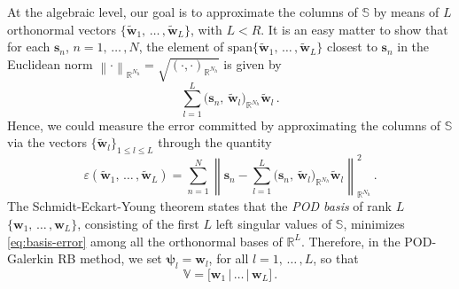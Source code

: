 \documentclass{elsarticle}
\numberwithin{equation}{section}
\theoremstyle{theorem}
\theoremstyle{definition}
\theoremstyle{remark}
\theoremstyle{proposition}
\numberwithin{figure}{section}
\newcommand{\norm}[1]{\left\lVert#1\right\rVert}
\newcommand{\wt}[1]{\widetilde{#1}}
\newcommand{\bg}[1]{\boldsymbol{#1}}
\begin{document}
		\noindent At the algebraic level, our goal is to approximate the columns of $\mathbb{S}$ by means of $L$ orthonormal vectors $\big\lbrace \wt{\mathbf{w}}_1, \, \ldots \, , \wt{\mathbf{w}}_L \big\rbrace$, with $L < R$. It is an easy matter to show that for each $\mathbf{s}_n$, $n = 1, \, \ldots \, , N$, the element of $\text{span} \big\lbrace \wt{\mathbf{w}}_1, \, \ldots \, , \wt{\mathbf{w}}_L \big\rbrace$ closest to $\mathbf{s}_n$ in the Euclidean norm $\norm{\cdot}_{\mathbb{R}^{N_h}} = \sqrt{(\cdot,\cdot)_{\mathbb{R}^{N_h}}}$ is given by
		\begin{equation*}
			\sum_{l = 1}^L \big( \mathbf{s}_n, \, \wt{\mathbf{w}}_l \big)_{\mathbb{R}^{N_h}} \wt{\mathbf{w}}_l \, .
		\end{equation*} 
		Hence, we could measure the error committed by approximating the columns of $\mathbb{S}$ via the vectors $\big\lbrace \wt{\mathbf{w}}_l \big\rbrace_{1 \leq l \leq L}$ through the quantity
		\begin{equation}
			\label{eq:basis-error}
			\varepsilon(\wt{\mathbf{w}}_1, \, \ldots \, , \wt{\mathbf{w}}_L) = \sum_{n = 1}^N \norm{\mathbf{s}_n - \sum_{l = 1}^L \big( \mathbf{s}_n, \, \wt{\mathbf{w}}_l \big)_{\mathbb{R}^{N_h}} \wt{\mathbf{w}}_l}_{\mathbb{R}^{N_h}}^2 \, .
		\end{equation}
		The Schmidt-Eckart-Young theorem \cite{EY36, Sch07} states that the \emph{POD basis} of rank $L$ $\big\lbrace \mathbf{w}_1, \, \ldots \, , \mathbf{w}_L \big\rbrace$, consisting of the first $L$ left singular values of $\mathbb{S}$, minimizes \eqref{eq:basis-error} among all the orthonormal bases of $\mathbb{R}^L$. Therefore, in the POD-Galerkin RB method, we set $\bg{\psi}_l = \mathbf{w}_l$, for all $l = 1, \, \ldots \, , L$, so that
		\begin{equation*}
			\mathbb{V} = \big[ \mathbf{w}_1 \, \big| \, \ldots \, \big| \, \mathbf{w}_L \big] \, . %
		\end{equation*}
	
\end{document}
